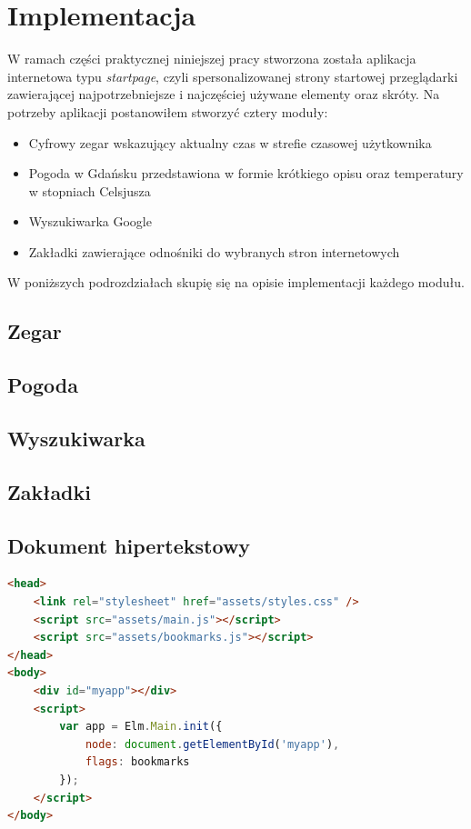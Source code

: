 \documentclass[twoside,a4paper]{report}
\begin{document}
\chapter{Implementacja}
W ramach części praktycznej niniejszej pracy stworzona została aplikacja internetowa typu \textit{startpage}, czyli spersonalizowanej strony startowej przeglądarki zawierającej najpotrzebniejsze i najczęściej używane elementy oraz skróty.
Na potrzeby aplikacji postanowiłem stworzyć cztery moduły:
\begin{itemize}
    \item Cyfrowy zegar wskazujący aktualny czas w strefie czasowej użytkownika
    \item Pogoda w Gdańsku przedstawiona w formie krótkiego opisu oraz temperatury w stopniach Celsjusza
    \item Wyszukiwarka Google
    \item Zakładki zawierające odnośniki do wybranych stron internetowych
\end{itemize}

W poniższych podrozdziałach skupię się na opisie implementacji każdego modułu.

\section{Zegar}

\section{Pogoda}

\section{Wyszukiwarka}

\section{Zakładki}

\section{Dokument hipertekstowy}
\begin{lstlisting}[caption={Zawartość pliku \texttt{index.html}},language=html]
<head>
    <link rel="stylesheet" href="assets/styles.css" />
    <script src="assets/main.js"></script>
    <script src="assets/bookmarks.js"></script>
</head>
<body>
    <div id="myapp"></div>
    <script>
        var app = Elm.Main.init({
            node: document.getElementById('myapp'),
            flags: bookmarks
        });
    </script>
</body>
\end{lstlisting}
\end{document}

